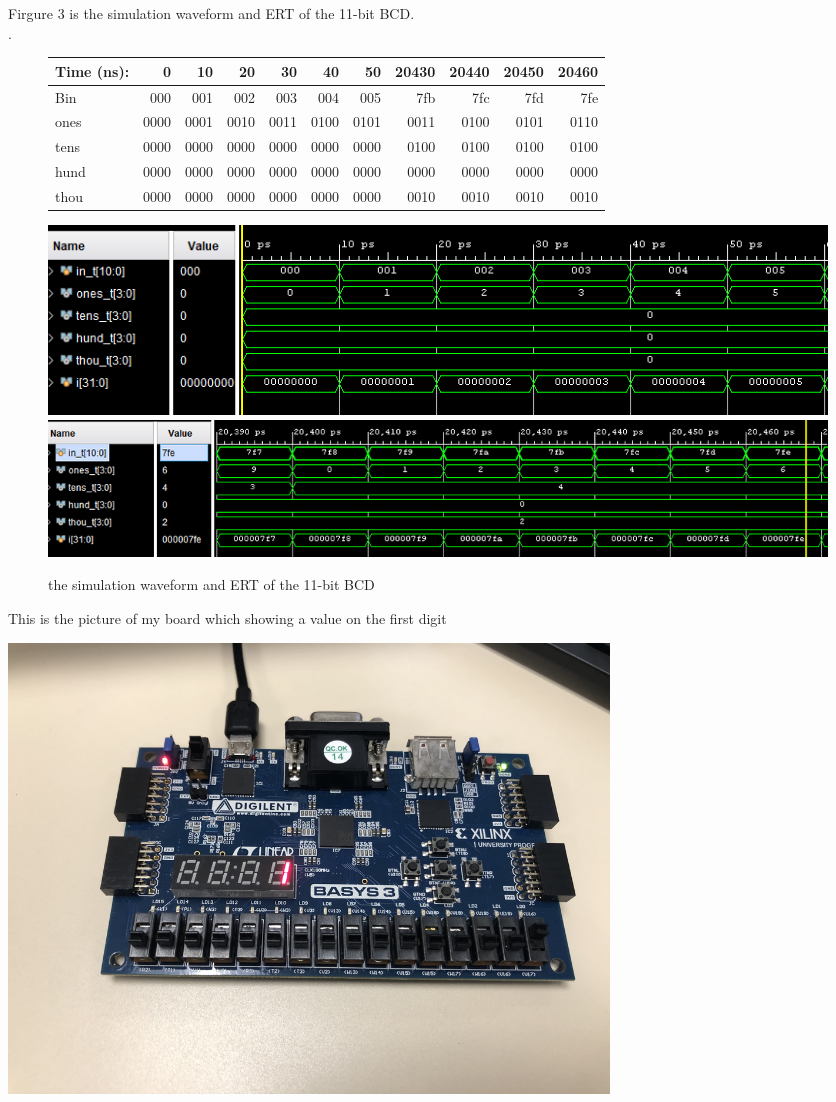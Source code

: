 \documentclass[11pt]{article}
\begin{document}
	
	Firgure 3 is the simulation waveform and ERT of the 11-bit BCD.\\
	.\\
	\begin{figure}[ht]\centering
		\begin{tabular}{l|rrrr|rrrr|rr}
			Time (ns): & 0 & 10 & 20 & 30 & 40 & 50 & 20430 & 20440 & 20450 & 20460 \\
			\midrule
			Bin & 000 & 001 & 002 & 003 & 004 & 005 & 7fb & 7fc & 7fd & 7fe \\
			\midrule
			ones & 0000 & 0001 & 0010 & 0011 & 0100 & 0101 & 0011 & 0100 & 0101 & 0110 \\
			tens & 0000 & 0000 & 0000 & 0000 & 0000 & 0000 & 0100 & 0100 & 0100 & 0100 \\
			hund & 0000 & 0000 & 0000 & 0000 & 0000 & 0000 & 0000 & 0000 & 0000 & 0000 \\
			thou & 0000 & 0000 & 0000 & 0000 & 0000 & 0000 & 0010 & 0010 & 0010 & 0010 \\
			\bottomrule
		\end{tabular}\medskip
		
		\includegraphics[width=1\textwidth]{bcd11_simulate_beginning}
		\includegraphics[width=1\textwidth]{bcd11_simulate_end}
		\caption{the simulation waveform and ERT of the 11-bit BCD}
		\label{fig:bcd11_simulate}
	\end{figure}
	
	This is the picture of my board which showing a value on the first digit\\
	\begin{center}
		\includegraphics[width=0.7\textwidth]{board1}
	\end{center}
	
\end{document}
